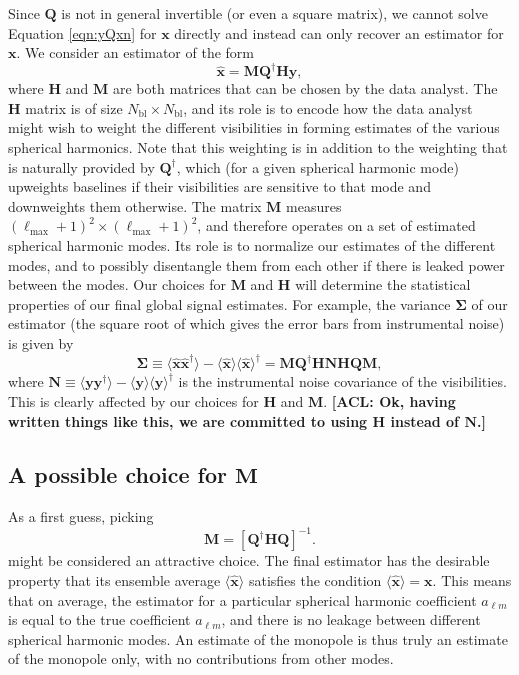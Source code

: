 \documentclass[twolcolumn,apj,iop,numberedappendix]{emulateapj}
\newcommand{\xhat}{\hat{\mathbf{x}}}
\newcommand{\y}{\mathbf{y}}
\newcommand{\N}{\mathbf{N}}
\newcommand{\Hmat}{\mathbf{H}}
\newcommand{\Q}{\mathbf{Q}}
\newcommand{\M}{\mathbf{M}}
\newcommand{\acl}[1]{{\color{red} \textbf{[ACL:  #1]}}}
\begin{document}
Since $\Q$ is not in general invertible (or even a square matrix), we cannot solve Equation \eqref{eqn:yQxn} for $\mathbf{x}$ directly and instead can only recover an estimator for $\mathbf{x}$. We consider an estimator of the form 
\begin{equation}
\mathbf{\hat x} = \M \Q^\dagger \Hmat \y,
\label{eqn:xhat}
\end{equation}
where $\Hmat$ and $\M$ are both matrices that can be chosen by the data analyst. The $\Hmat$ matrix is of size $N_\textrm{bl} \times N_\textrm{bl}$, and its role is to encode how the data analyst might wish to weight the different visibilities in forming estimates of the various spherical harmonics. Note that this weighting is in addition to the weighting that is naturally provided by $\Q^\dagger$, which (for a given spherical harmonic mode) upweights baselines if their visibilities are sensitive to that mode and downweights them otherwise. The matrix $\M$ measures $(\ell_\textrm{max} +1)^2 \times (\ell_\textrm{max} +1)^2$, and therefore operates on a set of estimated spherical harmonic modes. Its role is to normalize our estimates of the different modes, and to possibly disentangle them from each other if there is leaked power between the modes. Our choices for $\M$ and $\Hmat$ will determine the statistical properties of our final global signal estimates. For example, the variance $\boldsymbol \Sigma$ of our estimator (the square root of which gives the error bars from instrumental noise) is given by
\begin{equation}
\label{eq:NoiseMatrixSigma}
\boldsymbol \Sigma \equiv \langle \xhat \xhat^\dagger \rangle - \langle \xhat \rangle \langle \xhat \rangle^\dagger = \M \Q^\dagger \mathbf{H} \N \mathbf{H} \Q \M,
\end{equation}
where $\mathbf{N} \equiv \langle \y \y^\dagger \rangle - \langle \y \rangle \langle \y \rangle^\dagger$ is the instrumental noise covariance of the visibilities. This is clearly affected by our choices for $\mathbf{H}$ and $\M$. \acl{Ok, having written things like this, we are committed to using $\mathbf{H}$ instead of $\N$.}

\subsection{A possible choice for $\M$}
\label{sec:badMmatrix}
As a first guess, picking
\begin{equation}
\M = [\Q^\dagger \Hmat \Q]^{-1}.
\label{eqn:M}
\end{equation}
might be considered an attractive choice.
The final estimator has the desirable property that its ensemble average $\langle \mathbf{\hat x} \rangle$ satisfies the condition $\langle \mathbf{\hat x} \rangle = \mathbf{x}$. This means that on average, the estimator for a particular spherical harmonic coefficient $\hat{a}_{\ell m}$ is equal to the true coefficient ${a}_{\ell m}$, and there is no leakage between different spherical harmonic modes. An estimate of the monopole is thus truly an estimate of the monopole only, with no contributions from other modes.
\end{document}
